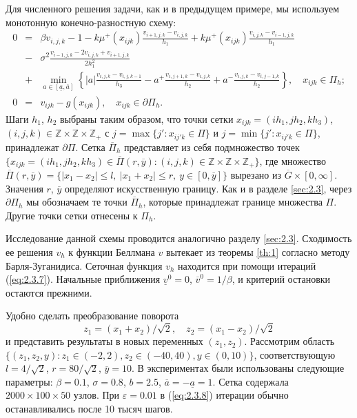 Для численного решения задачи, как и в предыдущем примере, мы используем монотонную конечно-разностную схему:
\begin{eqnarray*}
 0&=&\beta v_{i,j,k} -1 -k\mu^+(x_{ijk})\frac{v_{i+1,j,k}-v_{i,j,k}}{h_1}+k\mu^+(x_{ijk})\frac{v_{i,j,k}-v_{i-1,j,k}}{h_1}\\
 &-&\sigma^2\frac{v_{i-1,j,k}-2v_{i,j,k}+v_{i+1,j,k}}{2 h_1^2} \\
 &+&\min_{a \in [\underline a,\overline a]}
 \left\{|a|\frac{v_{i,j,k}-v_{i,j,k-1}}{h_3}-a^+\frac{v_{i,j+1,k}-v_{i,j,k}}{h_2} +a^-\frac{v_{i,j,k}-v_{i,j-1,k}}{h_2}   \right\}, \quad x_{ijk}\in \Pi_h;\\
0&=&v_{ijk}-g(x_{ijk}),  \quad x_{ijk}\in \partial \Pi_h.
\end{eqnarray*}
Шаги $h_1$, $h_2$ выбраны таким образом, что точки сетки $x_{ijk}=(ih_1,jh_2,kh_3)$, $(i,j,k)\in \mathbb Z\times\mathbb Z\times\mathbb Z_+$ с $j=\max\{j':x_{ij'k}\in \Pi\}$ и $j=\min\{j':x_{ij'k}\in \Pi\}$, принадлежат $\partial\Pi$.
Сетка $\overline\Pi_h$ представляет из себя подмножество точек $\{x_{ijk}=(ih_1,jh_2,kh_3)\in\overline\Pi(r,\overline y):(i,j,k)\in \mathbb Z\times\mathbb Z\times\mathbb Z_+\}$, где множество $\overline\Pi(r,\overline y)=\{|x_1-x_2|\le l,\ |x_1+x_2|\le r,\ y\in [0,\overline y]\}$ вырезано из $\overline G\times [0,\infty]$. Значения $r$, $\overline y$ определяют искусственную границу. Как и в разделе \ref{sec:2.3}, через $\partial\Pi_h$ мы обозначаем те точки $\overline\Pi_h$, которые принадлежат границе множества $\Pi$. Другие точки сетки отнесены к $\Pi_h$.

Исследование данной схемы проводится аналогично разделу \ref{sec:2.3}. Сходимость ее решения $v_h$ к функции Беллмана $v$ вытекает из теоремы \ref{th:1} согласно методу Барля-Зуганидиса. Сеточная функция $v_h$ находится при помощи итераций (\ref{eq:2.3.7}). Начальные приближения $\underline v^0=0$, $\overline v^0= 1/\beta$, и критерий остановки остаются прежними.

Удобно сделать преобразование поворота
$$z_1=(x_1+x_2)/\sqrt 2,\quad z_2=(x_1-x_2)/\sqrt 2$$
и представить результаты в новых переменных $(z_1,z_2)$. Рассмотрим область $\{(z_1,z_2,y):z_1\in (-2,2), z_2\in (-40,40), y\in(0,10)\}$, соответствующую $l=4/\sqrt 2$, $r=80/\sqrt 2$, $\overline y=10$. В экспериментах были использованы следующие параметры: $\beta=0.1$, $\sigma=0.8$, $b=2.5$, $\overline a=-\underline a=1$. Сетка содержала $2000\times 100\times 50$ узлов. При $\varepsilon=0.01$ в (\ref{eq:2.3.8}) итерации обычно останавливались после 10 тысяч шагов.



